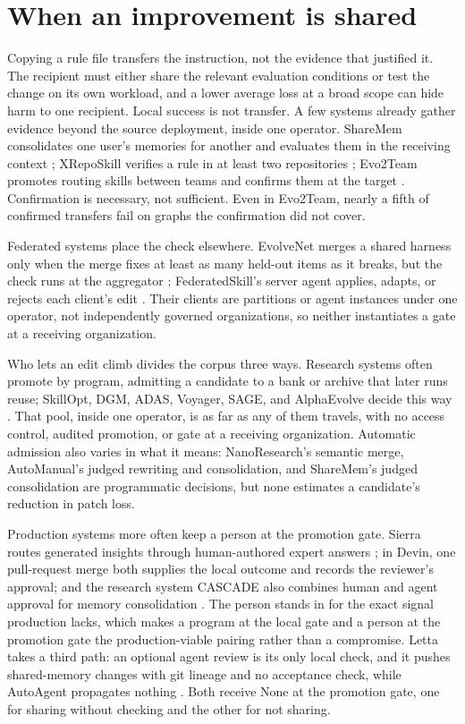 \section{When an improvement is shared}\label{sec:promotion}

Copying a rule file transfers the instruction, not the evidence that justified it. The recipient must either share the relevant evaluation conditions or test the change on its own workload, and a lower average loss at a broad scope can hide harm to one recipient. Local success is not transfer. A few systems already gather evidence beyond the source deployment, inside one operator. ShareMem consolidates one user's memories for another and evaluates them in the receiving context \citep{hu2026sharemem}; XRepoSkill verifies a rule in at least two repositories \citep{guo2026xreposkill}; Evo2Team promotes routing skills between teams and confirms them at the target \citep{wang2026evo2team}. Confirmation is necessary, not sufficient. Even in Evo2Team, nearly a fifth of confirmed transfers fail on graphs the confirmation did not cover.

Federated systems place the check elsewhere. EvolveNet merges a shared harness only when the merge fixes at least as many held-out items as it breaks, but the check runs at the aggregator \citep{nie2026evolvenet}; FederatedSkill's server agent applies, adapts, or rejects each client's edit \citep{yang2026federatedskill}. Their clients are partitions or agent instances under one operator, not independently governed organizations, so neither instantiates a gate at a receiving organization.

Who lets an edit climb divides the corpus three ways. Research systems often promote by program, admitting a candidate to a bank or archive that later runs reuse; SkillOpt, DGM, ADAS, Voyager, SAGE, and AlphaEvolve decide this way \citep{hu2024adas, wang2023voyager, alphaevolve2025}. That pool, inside one operator, is as far as any of them travels, with no access control, audited promotion, or gate at a receiving organization. Automatic admission also varies in what it means: NanoResearch's semantic merge, AutoManual's judged rewriting and consolidation, and ShareMem's judged consolidation are programmatic decisions, but none estimates a candidate's reduction in patch loss.

Production systems more often keep a person at the promotion gate. Sierra routes generated insights through human-authored expert answers \citep{sierra2025os20}; in Devin, one pull-request merge both supplies the local outcome and records the reviewer's approval; and the research system CASCADE also combines human and agent approval for memory consolidation \citep{huang2025cascade}. The person stands in for the exact signal production lacks, which makes a program at the local gate and a person at the promotion gate the production-viable pairing rather than a compromise. Letta takes a third path: an optional agent review is its only local check, and it pushes shared-memory changes with git lineage and no acceptance check, while AutoAgent propagates nothing \citep{wang2026autoagent}. Both receive None at the promotion gate, one for sharing without checking and the other for not sharing.


